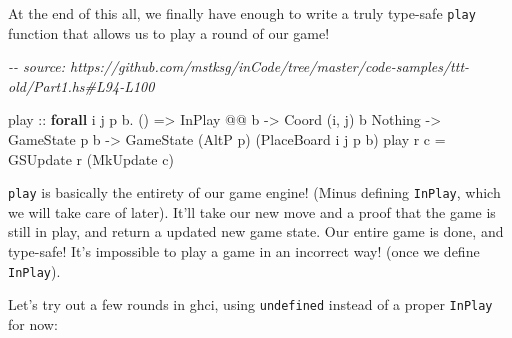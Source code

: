 \documentclass[]{article}
\newenvironment{Shaded}{}{}
\newcommand{\CommentTok}[1]{\textcolor[rgb]{0.38,0.63,0.69}{\textit{#1}}}
\newcommand{\DataTypeTok}[1]{\textcolor[rgb]{0.56,0.13,0.00}{#1}}
\newcommand{\KeywordTok}[1]{\textcolor[rgb]{0.00,0.44,0.13}{\textbf{#1}}}
\newcommand{\NormalTok}[1]{#1}
\newcommand{\OperatorTok}[1]{\textcolor[rgb]{0.40,0.40,0.40}{#1}}
\newcommand{\OtherTok}[1]{\textcolor[rgb]{0.00,0.44,0.13}{#1}}
\begin{document}
At the end of this all, we finally have enough to write a truly type-safe
\texttt{play} function that allows us to play a round of our game!

\begin{Shaded}
\begin{Highlighting}[]
\CommentTok{{-}{-} source: https://github.com/mstksg/inCode/tree/master/code{-}samples/ttt{-}old/Part1.hs\#L94{-}L100}

\NormalTok{play}
\OtherTok{    ::} \KeywordTok{forall}\NormalTok{ i j p b}\OperatorTok{.}\NormalTok{ ()}
    \OtherTok{=\textgreater{}} \DataTypeTok{InPlay} \OperatorTok{@@}\NormalTok{ b}
    \OtherTok{{-}\textgreater{}} \DataTypeTok{Coord}\NormalTok{ \textquotesingle{}(i, j) b }\DataTypeTok{\textquotesingle{}Nothing}
    \OtherTok{{-}\textgreater{}} \DataTypeTok{GameState}\NormalTok{ p b}
    \OtherTok{{-}\textgreater{}} \DataTypeTok{GameState}\NormalTok{ (}\DataTypeTok{AltP}\NormalTok{ p) (}\DataTypeTok{PlaceBoard}\NormalTok{ i j p b)}
\NormalTok{play r c }\OtherTok{=} \DataTypeTok{GSUpdate}\NormalTok{ r (}\DataTypeTok{MkUpdate}\NormalTok{ c)}
\end{Highlighting}
\end{Shaded}

\texttt{play} is basically the entirety of our game engine! (Minus defining
\texttt{InPlay}, which we will take care of later). It'll take our new move and
a proof that the game is still in play, and return a updated new game state. Our
entire game is done, and type-safe! It's impossible to play a game in an
incorrect way! (once we define \texttt{InPlay}).

Let's try out a few rounds in ghci, using \texttt{undefined} instead of a proper
\texttt{InPlay} for now:
\end{document}
